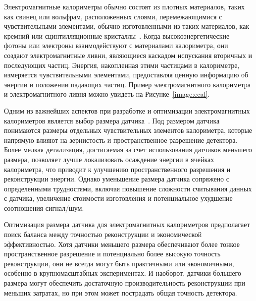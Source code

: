 \documentclass[a4paper,12pt]{extarticle}
\begin{document}
Электромагнитные калориметры обычно состоят из плотных материалов, таких как свинец или вольфрам, расположенных слоями, перемежающимися с чувствительными элементами, обычно изготовленными из таких материалов, как кремний или сцинтилляционные кристаллы~\cite{Barsuk:2000vna}. Когда высокоэнергетические фотоны или электроны взаимодействуют с материалами калориметра, они создают электромагнитные ливни, являющиеся каскадом испускания вторичных и последующих частиц. Энергия, накопленная этими частицами в калориметре, измеряется чувствительными элементами, предоставляя ценную информацию об энергии и положении падающих частиц. Пример электромагнитного калориметра и электромагнитного ливня можно увидеть на Рисунке~\ref{image:ecal}.

Одним из важнейших аспектов при разработке и оптимизации электромагнитных калориметров является выбор размера датчика~\cite{Boldyrev_2021}. Под размером датчика понимаются размеры отдельных чувствительных элементов калориметра, которые напрямую влияют на зернистость и пространственное разрешение детектора. Более мелкая детализация, достигаемая за счет использования датчиков меньшего размера, позволяет лучше локализовать осаждение энергии в ячейках калориметра, что приводит к улучшению пространственного разрешения и реконструкции энергии. Однако уменьшение размера датчика сопряжено с определенными трудностями, включая повышение сложности считывания данных с датчика, увеличение стоимости изготовления и потенциальное ухудшение соотношения сигнал/шум.

Оптимизация размера датчика для электромагнитных калориметров предполагает поиск баланса между точностью реконструкции и экономической эффективностью. Хотя датчики меньшего размера обеспечивают более тонкое пространственное разрешение и потенциально более высокую точность реконструкции, они не всегда могут быть практичными или экономичными, особенно в крупномасштабных экспериментах. И наоборот, датчики большего размера могут обеспечить достаточную производительность реконструкции при меньших затратах, но при этом может пострадать общая точность детектора.
\end{document}
